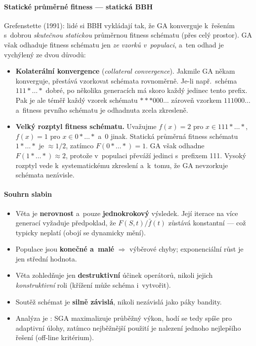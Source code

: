 \documentclass[11pt,a4paper]{article}
\theoremstyle{definition}
\begin{document}
\paragraph{Statické průměrné fitness --- statická BBH}

Grefenstette (1991): lidé si BBH vykládají tak, že GA konverguje k~řešením
s~dobrou \emph{skutečnou statickou} průměrnou fitness schématu (přes celý
prostor). GA však odhaduje fitness schématu jen \emph{ze vzorků v~populaci},
a~ten odhad je vychýlený ze dvou důvodů:

\begin{itemize}
\item \textbf{Kolaterální konvergence} (\emph{collateral convergence}).
  Jakmile GA někam konverguje, přestává vzorkovat schémata rovnoměrně.
  Je-li např.\ schéma $111{*}\ldots{*}$ dobré, po několika generacích má
  skoro každý jedinec tento prefix. Pak je ale téměř každý vzorek schématu
  ${*}{*}{*}000\ldots$ zároveň vzorkem $111000\ldots$ a~fitness prvního
  schématu je odhadnuta zcela zkresleně.
\item \textbf{Velký rozptyl fitness schématu.} Uvažujme
  $f(x) = 2$ pro $x \in 111{*}\ldots{*}$, $f(x)=1$ pro $x \in 0{*}\ldots{*}$
  a~$0$ jinak. Statická průměrná fitness schématu $1{*}\ldots{*}$ je $\approx 1/2$,
  zatímco $F(0{*}\ldots{*}) = 1$. GA však odhadne
  $F(1{*}\ldots{*}) \approx 2$, protože v~populaci převáží jedinci
  s~prefixem 111. Vysoký rozptyl vede k~systematickému zkreslení a~k~tomu,
  že GA nevzorkuje schémata nezávisle.
\end{itemize}

\paragraph{Souhrn slabin}

\begin{itemize}
\item Věta je \textbf{nerovnost} a~pouze \textbf{jednokrokový} výsledek. Její
  iterace na více generací vyžaduje předpoklad, že $F(S,t)/\bar f(t)$ zůstává
  konstantní --- což typicky neplatí (obojí se dynamicky mění).
\item Populace jsou \textbf{konečné a~malé} $\Rightarrow$ výběrové chyby;
  exponenciální růst je jen střední hodnota.
\item Věta zohledňuje jen \textbf{destruktivní} účinek operátorů, nikoli
  jejich \emph{konstruktivní} roli (křížení může schéma i~vytvořit).
\item Soutěž schémat je \textbf{silně závislá}, nikoli nezávislá jako páky
  bandity.
\item Analýza je : SGA maximalizuje průběžný výkon, hodí se tedy
  spíše pro adaptivní úlohy, zatímco nejběžnější použití je nalezení jednoho
  nejlepšího řešení (off-line kritérium).
\end{itemize}
\end{document}
